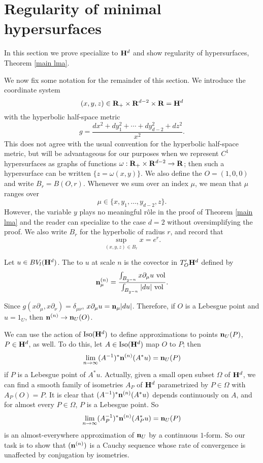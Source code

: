 \section{Regularity of minimal hypersurfaces}\label{DeGiorgiSection}
In this section we prove specialize to $\mathbf H^d$ and show regularity of hypersurfaces, Theorem \ref{main lma}.

We now fix some notation for the remainder of this section.
We introduce the coordinate system
$$(x, y, z) \in \mathbf{R}_+ \times \mathbf{R}^{d - 2} \times \mathbf{R} = \mathbf H^d$$
with the hyperbolic half-space metric
\begin{equation}\label{hyperbolic metric}
g = \frac{dx^2 + dy_1^2 + \cdots + dy_{d - 2}^2 + dz^2}{x^2}.
\end{equation}
This does not agree with the usual convention for the hyperbolic half-space metric, but will be advantageous for our purposes when we represent $C^1$ hypersurfaces as graphs of functions $\omega: \mathbf{R}_+ \times \mathbf{R}^{d - 2} \to \mathbf{R}$; then such a hypersurface can be written $\{z = \omega(x, y)\}$.
We also define the  $O = (1, 0, 0)$ and write $B_r = B(O, r)$.
Whenever we sum over an index $\mu$, we mean that $\mu$ ranges over
$$\mu \in \{x, y_1, \dots, y_{d - 2}, z\}.$$
However, the variable $y$ plays no meaningful r\^ole in the proof of Theorem \ref{main lma} and the reader can specialize to the case $d = 2$ without oversimplifying the proof.
We also write $B_r$ for the hyperbolic of radius $r$, and record that 
\begin{equation}\label{sup in a ball}
\sup_{(x, y, z) \in B_r} x = e^r.
\end{equation}

\begin{definition}
Let $u \in BV_l(\mathbf H^d)$. The  to $u$ at scale $n$ is the covector in $T_O' \mathbf H^d$ defined by
$$\mathbf n^{(n)}_\mu = \frac{\int_{B_{2^{-n}}} x \partial_\mu u ~\mathrm{vol}}{\int_{B_{2^{-n}}} |du| ~\mathrm{vol}}.$$
\end{definition}

Since $g(x\partial_\mu, x\partial_\nu) = \delta_{\mu\nu}$, $x\partial_\mu u = \mathbf n_\mu|du|$.
Therefore, if $O$ is a Lebesgue point and $u = 1_U$, then $\mathbf n^{(n)} \to \mathbf n_U(O)$.

We can use the action of $\operatorname{Iso}(\mathbf H^d)$ to define approximations to points $\mathbf n_U(P)$, $P \in \mathbf H^d$, as well.
To do this, let $A \in \operatorname{Iso}(\mathbf H^d)$ map $O$ to $P$; then 
$$\lim_{n \to \infty} (A^{-1})^* \mathbf n^{(n)}(A^* u) = \mathbf n_U(P)$$
if $P$ is a Lebesgue point of $A^* u$.
Actually, given a small open subset $\Omega$ of $\mathbf H^d$, we can find a smooth family of isometries $A_P$ of $\mathbf H^d$ parametrized by $P \in \Omega$ with $A_P(O) = P$.
It is clear that $(A^{-1})^* \mathbf n^{(n)}(A^* u)$ depends continuously on $A$, and for almost every $P \in \Omega$, $P$ is a Lebesgue point.
So
$$\lim_{n \to \infty} (A_P^{-1})^* \mathbf n^{(n)}(A_P^* u) = \mathbf n_U(P)$$
is an almost-everywhere approximation of $\mathbf n_U$ by a continuous $1$-form.
So our task is to show that $(\mathbf n^{(n)})$ is a Cauchy sequence whose rate of convergence is unaffected by conjugation by isometries.

